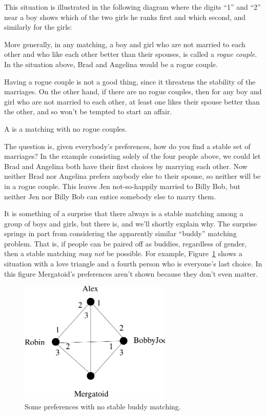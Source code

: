 This situation is illustrated in the following diagram where the digits
``1'' and ``2'' near a boy shows which of the two girls he ranks first and
which second, and similarly for the girls:


More generally, in any matching, a boy and girl who are not married to
each other and who like each other better than their spouses, is called a
{\em rogue couple}.  In the situation above, Brad and Angelina would be a
rogue couple.

Having a rogue couple is not a good thing, since it threatens the
stability of the marriages.  On the other hand, if there are no rogue
couples, then for any boy and girl who are not married to each other, at
least one likes their spouse better than the other, and so won't be
tempted to start an affair.

\begin{definition}
  A  is a matching with no rogue couples.
\end{definition}
 
The question is, given everybody's preferences, how do you find a stable
set of marriages?  In the example consisting solely of the four people
above, we could let Brad and Angelina both have their first choices by
marrying each other.  Now neither Brad nor Angelina prefers anybody else
to their spouse, so neither will be in a rogue couple.  This leaves Jen
not-so-happily married to Billy Bob, but neither Jen nor Billy Bob can
entice somebody else to marry them.
 
It is something of a surprise that there always is a stable matching among
a group of boys and girls, but there is, and we'll shortly explain why.
The surprise springs in part from considering the apparently similar
``buddy'' matching problem.  That is, if people can be paired off as
buddies, regardless of gender, then a stable matching \emph{may not} be
possible.  For example, Figure~\ref{fig:buddy} shows a situation with a
love triangle and a fourth person who is everyone's last choice.  In this
figure Mergatoid's preferences aren't shown because they don't even
matter.   

\begin{figure}[htbp]
\centering \includegraphics[height=2.3in]{figures/loveTriangle.pdf}
\caption{Some preferences with no stable buddy matching.}
\label{fig:buddy}
\end{figure}
 
